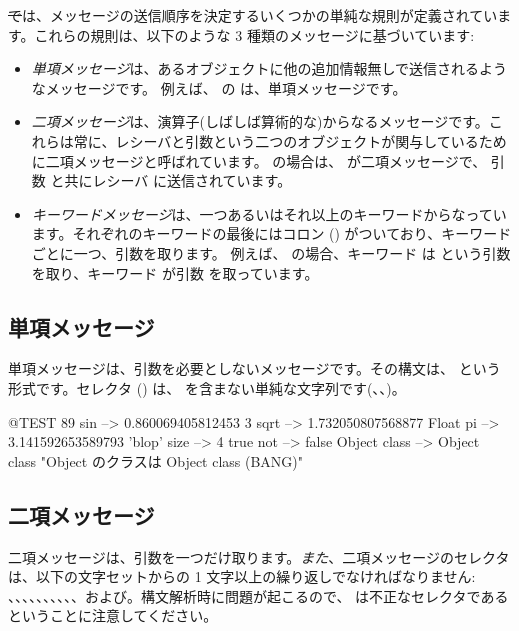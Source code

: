 \documentclass[a4paper,10pt,twoside]{book}
\begin{document}
\st では、メッセージの送信順序を決定するいくつかの単純な規則が定義されています。これらの規則は、以下のような 3 種類のメッセージに基づいています:
\begin{itemize}
\item \emph{単項メッセージ}は、あるオブジェクトに他の追加情報無しで送信されるようなメッセージです。 例えば、 の  は、単項メッセージです。
\item  \emph{二項メッセージ}は、演算子(しばしば算術的な)からなるメッセージです。これらは常に、レシーバと引数という二つのオブジェクトが関与しているために二項メッセージと呼ばれています。 の場合は、\ct{+} が二項メッセージで、 引数  と共にレシーバ  に送信されています。
\item  \emph{キーワードメッセージ}は、一つあるいはそれ以上のキーワードからなっています。それぞれのキーワードの最後にはコロン (\ct{:}) がついており、キーワードごとに一つ、引数を取ります。
例えば、 の場合、キーワード  は  という引数を取り、キーワード  が引数  を取っています。
\end{itemize}

\subsection{単項メッセージ}
単項メッセージは、引数を必要としないメッセージです。その構文は、 という形式です。セレクタ () は、\ct{:} を含まない単純な文字列です(\eg {}、、)。
\begin{code}{@TEST}
89 sin           --> 0.860069405812453
3 sqrt           --> 1.732050807568877
Float pi         --> 3.141592653589793
'blop' size     --> 4
true not        --> false
Object class --> Object class  "Object のクラスは Object class (BANG)"
\end{code}


\subsection{二項メッセージ} 
二項メッセージは、引数を一つだけ取ります。\emph{また}、二項メッセージのセレクタは、以下の文字セットからの 1 文字以上の繰り返しでなければなりません: \ct{+}、\ct{-}、\ct{*}、\ct{/}、\ct{\&}、\ct{=}、\ct{>}、\ct{|}、\ct{<}、\ct{\~}、および。構文解析時に問題が起こるので、\ct{--} は不正なセレクタであるということに注意してください。
\end{document}
